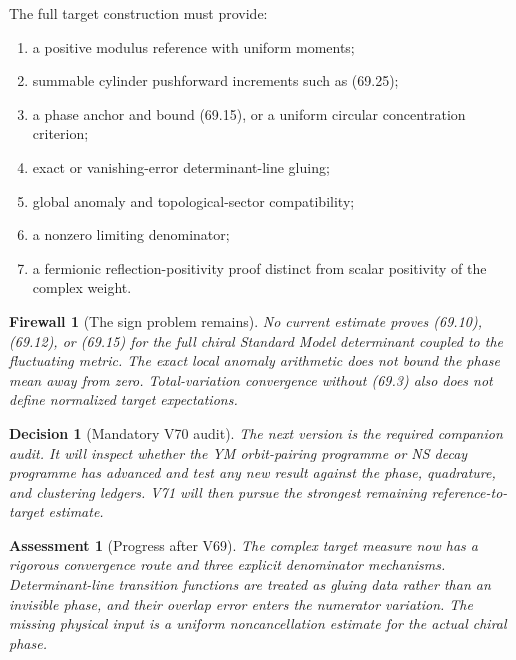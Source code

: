 \documentclass[11pt]{article}
\newtheorem{assessment}[theorem]{Assessment}
\newtheorem{firewall}[theorem]{Firewall}
\newtheorem{decision}[theorem]{Decision}
\begin{document}
\begin{ledger}
\label{led:v11v69-data}
The full target construction must provide:
\begin{enumerate}
\item a positive modulus reference with uniform moments;
\item summable cylinder pushforward increments such as (69.25);
\item a phase anchor and bound (69.15), or a uniform circular
concentration criterion;
\item exact or vanishing-error determinant-line gluing;
\item global anomaly and topological-sector compatibility;
\item a nonzero limiting denominator;
\item a fermionic reflection-positivity proof distinct from scalar
positivity of the complex weight.
\end{enumerate}
\end{ledger}

\begin{firewall}[The sign problem remains]
\label{fire:v11v69-boundary}
No current estimate proves (69.10), (69.12), or (69.15) for the full
chiral Standard Model determinant coupled to the fluctuating metric.
The exact local anomaly arithmetic does not bound the phase mean away
from zero.  Total-variation convergence without (69.3) also does not
define normalized target expectations.
\end{firewall}

\begin{decision}[Mandatory V70 audit]
\label{dec:v11v69-next}
The next version is the required companion audit.  It will inspect
whether the YM orbit-pairing programme or NS decay programme has
advanced and test any new result against the phase, quadrature, and
clustering ledgers.  V71 will then pursue the strongest remaining
reference-to-target estimate.
\end{decision}

\begin{assessment}[Progress after V69]
\label{ass:v11v69-status}
The complex target measure now has a rigorous convergence route and
three explicit denominator mechanisms.  Determinant-line transition
functions are treated as gluing data rather than an invisible phase,
and their overlap error enters the numerator variation.  The missing
physical input is a uniform noncancellation estimate for the actual
chiral phase.
\end{assessment}
\end{document}
